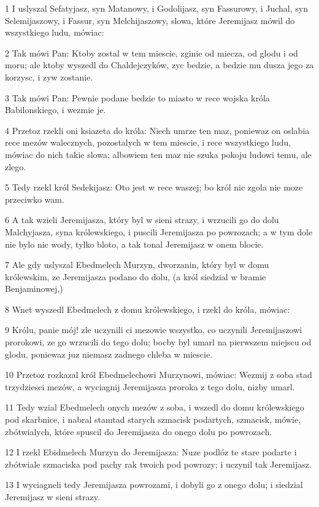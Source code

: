 \par 1 I uslyszal Sefatyjasz, syn Matanowy, i Godolijasz, syn Fassurowy, i Juchal, syn Selemijaszowy, i Fassur, syn Melchijaszowy, slowa, które Jeremijasz mówil do wszystkiego ludu, mówiac:
\par 2 Tak mówi Pan: Ktoby zostal w tem miescie, zginie od miecza, od glodu i od moru; ale ktoby wyszedl do Chaldejczyków, zyc bedzie, a bedzie mu dusza jego za korzysc, i zyw zostanie.
\par 3 Tak mówi Pan: Pewnie podane bedzie to miasto w rece wojska króla Babilonskiego, i wezmie je.
\par 4 Przetoz rzekli oni ksiazeta do króla: Niech umrze ten maz, poniewaz on oslabia rece mezów walecznych, pozostalych w tem miescie, i rece wszystkiego ludu, mówiac do nich takie slowa; albowiem ten maz nie szuka pokoju ludowi temu, ale zlego.
\par 5 Tedy rzekl król Sedekijasz: Oto jest w rece waszej; bo król nic zgola nie moze przeciwko wam.
\par 6 A tak wzieli Jeremijasza, który byl w sieni strazy, i wrzucili go do dolu Malchyjasza, syna królewskiego, i puscili Jeremijasza po powrozach; a w tym dole nie bylo nic wody, tylko bloto, a tak tonal Jeremijasz w onem blocie.
\par 7 Ale gdy uslyszal Ebedmelech Murzyn, dworzanin, który byl w domu królewskim, ze Jeremijasza podano do dolu, (a król siedzial w bramie Benjaminowej,)
\par 8 Wnet wyszedl Ebedmelech z domu królewskiego, i rzekl do króla, mówiac:
\par 9 Królu, panie mój! zle uczynili ci mezowie wszystko, co uczynili Jeremijaszowi prorokowi, ze go wrzucili do tego dolu; bocby byl umarl na pierwszem miejscu od glodu, poniewaz juz niemasz zadnego chleba w miescie.
\par 10 Przetoz rozkazal król Ebedmelechowi Murzynowi, mówiac: Wezmij z soba stad trzydziesci mezów, a wyciagnij Jeremijasza proroka z tego dolu, nizby umarl.
\par 11 Tedy wzial Ebedmelech onych mezów z soba, i wszedl do domu królewskiego pod skarbnice, i nabral stamtad starych szmacisk podartych, szmacisk, mówie, zbótwialych, które spuscil do Jeremijasza do onego dolu po powrozach.
\par 12 I rzekl Ebidmelech Murzyn do Jeremijasza: Nuze podlóz te stare podarte i zbótwiale szmaciska pod pachy rak twoich pod powrozy; i uczynil tak Jeremijasz.
\par 13 I wyciagneli tedy Jeremijasza powrozami, i dobyli go z onego dolu; i siedzial Jeremijasz w sieni strazy.
